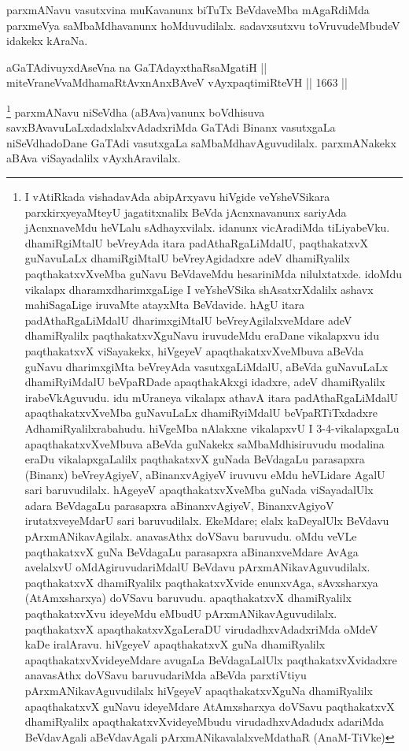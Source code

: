 \begin{artha}
parxmANavu vasutxvina muKavanunx biTuTx BeVdaveMba mAgaRdiMda parxmeVya saMbaMdhavanunx hoMduvudilalx. sadavxsutxvu toVruvudeMbudeV idakekx kAraNa.
\end{artha} 


\begin{shl}
aGaTAdivuyxdAseVna na GaTAdayxthaRsaMgatiH || \\
miteVraneVvaMdhamaRtAvxnAnxBAveV vAyxpaqtimiRteVH ||  1663 ||  
\end{shl}

\begin{artha}
\footnote{I vAtiRkada vishadavAda abipArxyavu hiVgide veYsheVSikara parxkirxyeyaMteyU jagatitxnalilx BeVda jAcnxnavanunx sariyAda jAcnxnaveMdu heVLalu sAdhayxvilalx. idanunx vicAradiMda tiLiyabeVku. dhamiRgiMtalU beVreyAda itara padAthaRgaLiMdalU, paqthakatxvX guNavuLaLx dhamiRgiMtalU beVreyAgidadxre adeV dhamiRyalilx paqthakatxvXveMba guNavu BeVdaveMdu hesariniMda nilulxtatxde. idoMdu vikalapx dharamxdharimxgaLige I veYsheVSika shAsatxrXdalilx ashavx mahiSagaLige iruvaMte atayxMta BeVdavide. hAgU itara padAthaRgaLiMdalU dharimxgiMtalU beVreyAgilalxveMdare adeV dhamiRyalilx paqthakatxvXguNavu iruvudeMdu eraDane vikalapxvu idu paqthakatxvX viSayakekx, hiVgeyeV apaqthakatxvXveMbuva aBeVda guNavu dharimxgiMta beVreyAda vasutxgaLiMdalU, aBeVda guNavuLaLx dhamiRyiMdalU beVpaRDade apaqthakAkxgi idadxre, adeV dhamiRyalilx irabeVkAguvudu. idu mUraneya vikalapx athavA itara padAthaRgaLiMdalU apaqthakatxvXveMba guNavuLaLx dhamiRyiMdalU beVpaRTiTxdadxre AdhamiRyalilxrabahudu. hiVgeMba nAlakxne vikalapxvU I 3-4-vikalapxgaLu apaqthakatxvXveMbuva aBeVda guNakekx saMbaMdhisiruvudu modalina eraDu vikalapxgaLalilx paqthakatxvX guNada BeVdagaLu parasapxra (Binanx) beVreyAgiyeV, aBinanxvAgiyeV iruvuvu eMdu heVLidare AgalU sari baruvudilalx. hAgeyeV apaqthakatxvXveMba guNada viSayadalUlx adara BeVdagaLu parasapxra aBinanxvAgiyeV, BinanxvAgiyoV irutatxveyeMdarU sari baruvudilalx. EkeMdare; elalx kaDeyalUlx BeVdavu pArxmANikavAgilalx. anavasAthx doVSavu baruvudu. oMdu veVLe paqthakatxvX guNa BeVdagaLu parasapxra aBinanxveMdare AvAga avelalxvU oMdAgiruvudariMdalU BeVdavu pArxmANikavAguvudilalx. paqthakatxvX dhamiRyalilx paqthakatxvXvide enunxvAga, sAvxsharxya (AtAmxsharxya) doVSavu baruvudu. apaqthakatxvX dhamiRyalilx paqthakatxvXvu ideyeMdu eMbudU pArxmANikavAguvudilalx. paqthakatxvX apaqthakatxvXgaLeraDU virudadhxvAdadxriMda oMdeV kaDe iralAravu. hiVgeyeV apaqthakatxvX guNa dhamiRyalilx apaqthakatxvXvideyeMdare avugaLa BeVdagaLalUlx paqthakatxvXvidadxre anavasAthx doVSavu baruvudariMda aBeVda parxtiVtiyu pArxmANikavAguvudilalx hiVgeyeV apaqthakatxvXguNa dhamiRyalilx apaqthakatxvX guNavu ideyeMdare AtAmxsharxya doVSavu paqthakatxvX dhamiRyalilx apaqthakatxvXvideyeMbudu virudadhxvAdadudx adariMda BeVdavAgali aBeVdavAgali pArxmANikavalalxveMdathaR (AnaM-TiVke)}
parxmANavu niSeVdha (aBAva)vanunx boVdhisuva savxBAvavuLaLxdadxlalxvAdadxriMda GaTAdi Binanx vasutxgaLa niSeVdhadoDane GaTAdi vasutxgaLa saMbaMdhavAguvudilalx. parxmANakekx aBAva viSayadalilx vAyxhAravilalx.
\end{artha}

